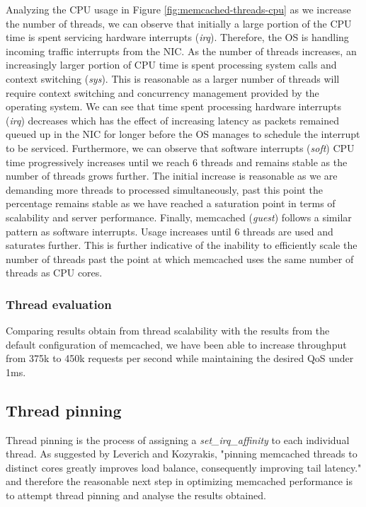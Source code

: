 Analyzing the CPU usage in Figure \ref{fig:memcached-threads-cpu} as we increase the number of threads, we can observe that initially a large portion of the CPU time is spent servicing hardware interrupts (\textit{irq}). Therefore, the OS is handling incoming traffic interrupts from the NIC. As the number of threads increases, an increasingly larger portion of CPU time is spent processing system calls and context switching (\textit{sys}). This is reasonable as a larger number of threads will require context switching and concurrency management provided by the operating system. We can see that time spent processing hardware interrupts (\textit{irq}) decreases which has the effect of increasing latency as packets remained queued up in the NIC for longer before the OS manages to schedule the interrupt to be serviced. Furthermore, we can observe that software interrupts (\textit{soft}) CPU time progressively increases until we reach 6 threads and remains stable as the number of threads grows further. The initial increase is reasonable as we are demanding more threads to processed simultaneously, past this point the percentage remains stable as we have reached a saturation point in terms of scalability and server performance. Finally, memcached (\textit{guest}) follows a similar pattern as software interrupts. Usage increases until 6 threads are used and saturates further. This is further indicative of the inability to efficiently scale the number of threads past the point at which memcached uses the same number of threads as CPU cores.

\subsubsection{Thread evaluation}
Comparing results obtain from thread scalability with the results from the default configuration of memcached, we have been able to increase throughput from 375k to 450k requests per second while maintaining the desired QoS under 1ms.



\subsection{Thread pinning}
\label{sec:thread-pinning}
Thread pinning is the process of assigning a \textit{set\_irq\_affinity} to each individual thread. As suggested by Leverich and Kozyrakis, "pinning memcached threads to distinct cores greatly improves load balance, consequently improving tail latency." \cite{leverich2014reconciling} and therefore the reasonable next step in optimizing memcached performance is to attempt thread pinning and analyse the results obtained.

